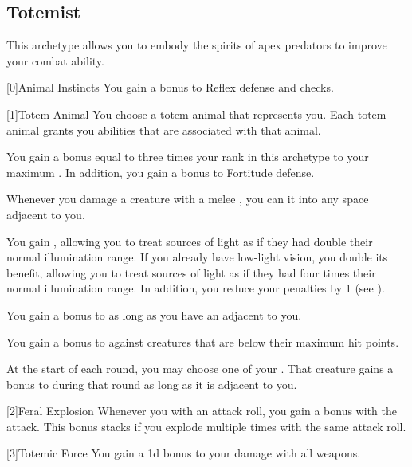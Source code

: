     \newpage
    \subsection{Totemist}
        This archetype allows you to embody the spirits of apex predators to improve your combat ability.

        [0]{Animal Instincts} You gain a  bonus to Reflex defense and  checks.

        [1]{Totem Animal} You choose a totem animal that represents you.
        Each totem animal grants you abilities that are associated with that animal.
        {
             You gain a bonus equal to three times your rank in this archetype to your maximum .
            In addition, you gain a  bonus to Fortitude defense.

             Whenever you damage a creature with a melee , you can  it into any space adjacent to you.

             You gain , allowing you to treat sources of light as if they had double their normal illumination range.
            If you already have low-light vision, you double its benefit, allowing you to treat sources of light as if they had four times their normal illumination range.
            In addition, you reduce your  penalties by 1 (see ).

             You gain a  bonus to  as long as you have an  adjacent to you.

             You gain a  bonus to  against creatures that are below their maximum hit points.

             At the start of each round, you may choose one of your .
            That creature gains a  bonus to  during that round as long as it is adjacent to you.
        }

        [2]{Feral Explosion} Whenever you  with an attack roll, you gain a   bonus with the attack.
        This bonus stacks if you explode multiple times with the same attack roll.

        [3]{Totemic Force} You gain a \plus1d bonus to your damage with all weapons.


